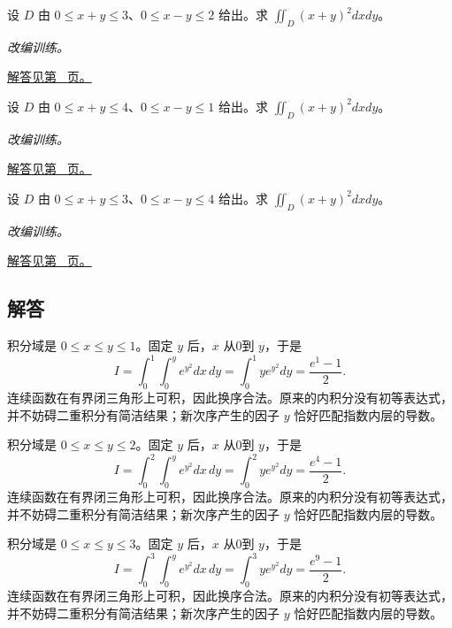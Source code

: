 \documentclass[UTF8,12pt,a4paper,fontset=fandol]{ctexart}
\begin{document}
\begin{example}[沿斜边界的线性换元]\label{ex:c37q22}
设 $D$ 由 $0\le x+y\le 3$、$0\le x-y\le 2$ 给出。求 $\displaystyle\iint_D(x+y)^2dxdy$。
\par\textit{改编训练。}\par\hyperref[ans:c37q22]{解答见第~\pageref{ans:c37q22} 页。}
\end{example}
\begin{example}[沿斜边界的线性换元]\label{ex:c37q23}
设 $D$ 由 $0\le x+y\le 4$、$0\le x-y\le 1$ 给出。求 $\displaystyle\iint_D(x+y)^2dxdy$。
\par\textit{改编训练。}\par\hyperref[ans:c37q23]{解答见第~\pageref{ans:c37q23} 页。}
\end{example}
\begin{example}[沿斜边界的线性换元]\label{ex:c37q24}
设 $D$ 由 $0\le x+y\le 3$、$0\le x-y\le 4$ 给出。求 $\displaystyle\iint_D(x+y)^2dxdy$。
\par\textit{改编训练。}\par\hyperref[ans:c37q24]{解答见第~\pageref{ans:c37q24} 页。}
\end{example}
\subsection{解答}
\begin{solve}\label{ans:c37q1}
积分域是 $0\le x\le y\le 1$。固定 $y$ 后，$x$ 从0到 $y$，于是
\[
I=\int_0^{1}\int_0^y e^{y^2}dx\,dy=\int_0^{1}y e^{y^2}dy=\frac{e^{1}-1}2.
\]
连续函数在有界闭三角形上可积，因此换序合法。原来的内积分没有初等表达式，并不妨碍二重积分有简洁结果；新次序产生的因子 $y$ 恰好匹配指数内层的导数。
\end{solve}

\begin{solve}\label{ans:c37q2}
积分域是 $0\le x\le y\le 2$。固定 $y$ 后，$x$ 从0到 $y$，于是
\[
I=\int_0^{2}\int_0^y e^{y^2}dx\,dy=\int_0^{2}y e^{y^2}dy=\frac{e^{4}-1}2.
\]
连续函数在有界闭三角形上可积，因此换序合法。原来的内积分没有初等表达式，并不妨碍二重积分有简洁结果；新次序产生的因子 $y$ 恰好匹配指数内层的导数。
\end{solve}

\begin{solve}\label{ans:c37q3}
积分域是 $0\le x\le y\le 3$。固定 $y$ 后，$x$ 从0到 $y$，于是
\[
I=\int_0^{3}\int_0^y e^{y^2}dx\,dy=\int_0^{3}y e^{y^2}dy=\frac{e^{9}-1}2.
\]
连续函数在有界闭三角形上可积，因此换序合法。原来的内积分没有初等表达式，并不妨碍二重积分有简洁结果；新次序产生的因子 $y$ 恰好匹配指数内层的导数。
\end{solve}
\end{document}

